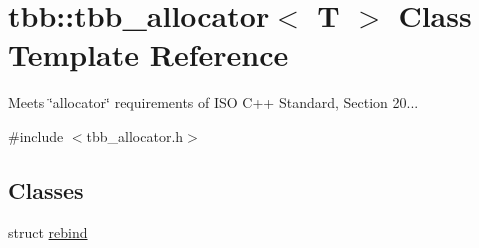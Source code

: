 \hypertarget{classtbb_1_1tbb__allocator}{}\section{tbb\+:\+:tbb\+\_\+allocator$<$ T $>$ Class Template Reference}
\label{classtbb_1_1tbb__allocator}


Meets \char`\"{}allocator\char`\"{} requirements of I\+S\+O C++ Standard, Section 20...  




{\ttfamily \#include $<$tbb\+\_\+allocator.\+h$>$}

\subsection*{Classes}
\begin{DoxyCompactItemize}
\item 
struct \hyperlink{structtbb_1_1tbb__allocator_1_1rebind}{rebind}
\end{DoxyCompactItemize}
